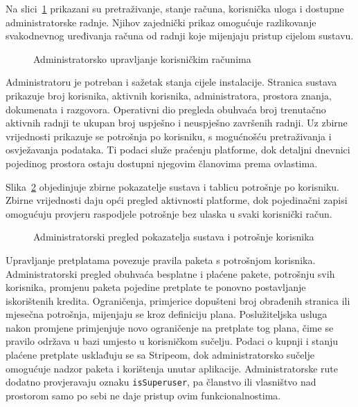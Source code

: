 Na slici~\ref{fig:administracija-korisnika} prikazani su pretraživanje, stanje računa, korisnička uloga i dostupne administratorske radnje. Njihov zajednički prikaz omogućuje razlikovanje svakodnevnog uređivanja računa od radnji koje mijenjaju pristup cijelom sustavu.

\begin{figure}[H]
    \centering
    \caption{Administratorsko upravljanje korisničkim računima}
    \label{fig:administracija-korisnika}
\end{figure}

Administratoru je potreban i sažetak stanja cijele instalacije. Stranica sustava prikazuje broj korisnika, aktivnih korisnika, administratora, prostora znanja, dokumenata i razgovora. Operativni dio pregleda obuhvaća broj trenutačno aktivnih radnji te ukupan broj uspješno i neuspješno završenih radnji. Uz zbirne vrijednosti prikazuje se potrošnja po korisniku, s mogućnošću pretraživanja i osvježavanja podataka. Ti podaci služe praćenju platforme, dok detaljni dnevnici pojedinog prostora ostaju dostupni njegovim članovima prema ovlastima.

Slika~\ref{fig:administratorski-pregled} objedinjuje zbirne pokazatelje sustava i tablicu potrošnje po korisniku. Zbirne vrijednosti daju opći pregled aktivnosti platforme, dok pojedinačni zapisi omogućuju provjeru raspodjele potrošnje bez ulaska u svaki korisnički račun.

\begin{figure}[H]
    \centering
    \caption{Administratorski pregled pokazatelja sustava i potrošnje korisnika}
    \label{fig:administratorski-pregled}
\end{figure}

Upravljanje pretplatama povezuje pravila paketa s potrošnjom korisnika. Administratorski pregled obuhvaća besplatne i plaćene pakete, potrošnju svih korisnika, promjenu paketa pojedine pretplate te ponovno postavljanje iskorištenih kredita. Ograničenja, primjerice dopušteni broj obrađenih stranica ili mjesečna potrošnja, mijenjaju se kroz definiciju plana. Poslužiteljska usluga nakon promjene primjenjuje novo ograničenje na pretplate tog plana, čime se pravilo održava u bazi umjesto u korisničkom sučelju. Podaci o kupnji i stanju plaćene pretplate usklađuju se sa Stripeom, dok administratorsko sučelje omogućuje nadzor paketa i korištenja unutar aplikacije. Administratorske rute dodatno provjeravaju oznaku \texttt{isSuperuser}, pa članstvo ili vlasništvo nad prostorom samo po sebi ne daje pristup ovim funkcionalnostima.

